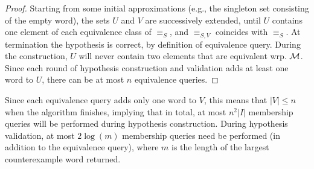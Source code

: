 \begin{proof}
Starting from some initial approximations (e.g., the singleton
set consisting of the empty word), the sets $U$ and $V$ are
successively extended, until $U$ contains one element of each equivalence
class of $\equiv_{S}$, and $\equiv_{S,V}$ coincides with
$\equiv_{S}$. 
At termination the hypothesis is correct, by definition of equivalence query.
During the construction, $U$ will never contain two elements that are
equivalent wrp. ${\mathcal M}$.
Since each round of hypothesis construction and validation adds at least one
word to $U$, there can be at most $n$ equivalence queries.
\end{proof}

Since each equivalence query adds only one
word to $V$, this means that $|V| \leq n$ when the algorithm finishes,
implying that in total, at most $n^2|I|$ membership queries
will be performed during hypothesis construction.
During hypothesis
validation, at most $2\log(m)$ membership queries need be performed
(in addition to the equivalence query), where
$m$ is the length of the largest counterexample word returned.

